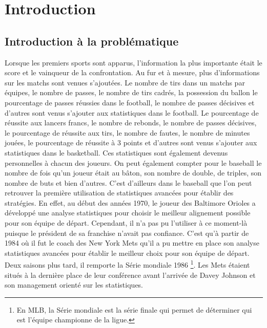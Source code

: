 \documentclass[12pt]{article}
\begin{document}
\newpage

\tableofcontents
\newpage

\section{Introduction}

\subsection{Introduction à la problématique}
\noindent Lorsque les premiers sports sont apparus, l'information la plus importante était le score et le vainqueur de la confrontation.
Au fur et à mesure, plus d'informations sur les matchs sont venues s'ajoutées.
Le nombre de tirs dans un matchs par équipes, le nombre de passes, le nombre de tirs cadrés, la possession du ballon le pourcentage de passes réussies dans le football, le nombre de passes décisives et d'autres sont venus s'ajouter aux statistiques dans le football.
Le pourcentage de réussite aux lancers francs, le nombre de rebonds, le nombre de passes décisives, le pourcentage de réussite aux tirs, le nombre de fautes, le nombre de minutes jouées, le pourcentage de réussite à 3 points et d'autres sont venus s'ajouter aux statistiques dans le basketball.
Ces statistiques sont également devenus personnelles à chacun des joueurs.
On peut également compter pour le baseball le nombre de fois qu'un joueur était au bâton, son nombre de double, de triples, son nombre de buts et bien d'autres.
\newline\newline
C'est d'ailleurs dans le baseball que l'on peut retrouver la première utilisation de statistiques avancées pour établir des stratégies.
En effet, au début des années 1970, le joueur des Baltimore Orioles a développé une analyse statistiques pour choisir le meilleur alignement possible pour son équipe de départ.
Cependant, il n'a pas pu l'utiliser à ce moment-là puisque le président de sa franchise n'avait pas confiance. C'est qu'à partir de 1984 où il fut le coach des New York Mets qu'il a pu mettre en place son analyse statistiques avancées pour établir le meilleur choix pour son équipe de départ. \cite{incPCMag1984}
Deux saisons plus tard, il remporte la Série mondiale 1986 \footnote{En MLB, la Série mondiale est la série finale qui permet de déterminer qui est l'équipe championne de la ligue.}. Les Mets étaient situés à la dernière place de leur conférence avant l'arrivée de Davey Johnson et son management orienté sur les statistiques.
\end{document}
